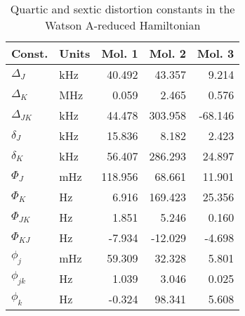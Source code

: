 \begin{table}
\centering
\caption{Quartic and sextic distortion constants in the Watson A-reduced Hamiltonian}
\begin{tabular}{llrrr}
Const.        & Units    &     Mol. 1 &     Mol. 2 &     Mol. 3 \\
\hline
$\Delta_{J}$  & kHz      &     40.492 &     43.357 &      9.214 \\
$\Delta_{K}$  & MHz      &      0.059 &      2.465 &      0.576 \\
$\Delta_{JK}$ & kHz      &     44.478 &    303.958 &    -68.146 \\
$\delta_{J}$  & kHz      &     15.836 &      8.182 &      2.423 \\
$\delta_{K}$  & kHz      &     56.407 &    286.293 &     24.897 \\
\hline
$\Phi_{J}$    & mHz      &    118.956 &     68.661 &     11.901 \\
$\Phi_{K}$    & Hz       &      6.916 &    169.423 &     25.356 \\
$\Phi_{JK}$   & Hz       &      1.851 &      5.246 &      0.160 \\
$\Phi_{KJ}$   & Hz       &     -7.934 &    -12.029 &     -4.698 \\
$\phi_{j}$    & mHz      &     59.309 &     32.328 &      5.801 \\
$\phi_{jk}$   & Hz       &      1.039 &      3.046 &      0.025 \\
$\phi_{k}$    & Hz       &     -0.324 &     98.341 &      5.608 \\
\end{tabular}
\end{table}

